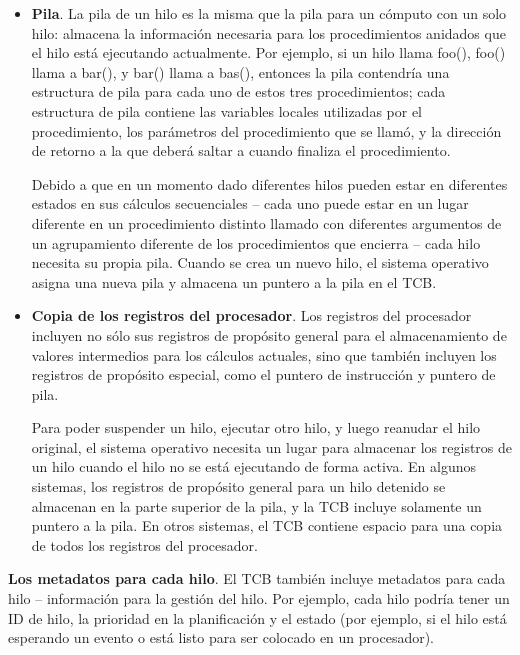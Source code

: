 \documentclass[10pt]{book}
\begin{document}
\begin{itemize}
\item \textbf{Pila}. La pila de un hilo es la misma que la pila para un cómputo con un solo hilo: almacena la información necesaria para los procedimientos anidados que el hilo está ejecutando actualmente. Por ejemplo, si un hilo llama {\mf foo()}, {\mf foo()} llama a {\mf bar()}, y {\mf bar()} llama a {\mf bas()}, entonces la pila contendría una estructura de pila para cada uno de estos tres procedimientos; cada estructura de pila contiene las variables locales utilizadas por el procedimiento, los parámetros del procedimiento que se llamó, y la dirección de retorno a la que deberá saltar a cuando finaliza el procedimiento.

Debido a que en un momento dado diferentes hilos pueden estar en diferentes estados en sus cálculos secuenciales -- cada uno puede estar en un lugar diferente en un procedimiento distinto llamado con diferentes argumentos de un agrupamiento diferente de los procedimientos que encierra -- cada hilo necesita su propia pila. Cuando se crea un nuevo hilo, el sistema operativo asigna una nueva pila y almacena un puntero a la pila en el TCB.

\item \textbf{Copia de los registros del procesador}. Los registros del procesador incluyen no sólo sus registros de propósito general para el almacenamiento de valores intermedios para los cálculos actuales, sino que también incluyen los registros de propósito especial, como el puntero de instrucción y puntero de pila.

Para poder suspender un hilo, ejecutar otro hilo, y luego reanudar el hilo original, el sistema operativo necesita un lugar para almacenar los registros de un hilo cuando el hilo no se está ejecutando de forma activa. En algunos sistemas, los registros de propósito general para un hilo detenido se almacenan en la parte superior de la pila, y la TCB incluye solamente un puntero a la pila. En otros sistemas, el TCB contiene espacio para una copia de todos los registros del procesador.
\end{itemize}

\textbf{Los metadatos para cada hilo}. El TCB también incluye metadatos para cada hilo -- información para la gestión del hilo. Por ejemplo, cada hilo podría tener un ID de hilo, la prioridad en la planificación y el estado (por ejemplo, si el hilo está esperando un evento o está listo para ser colocado en un procesador).
\end{document}
